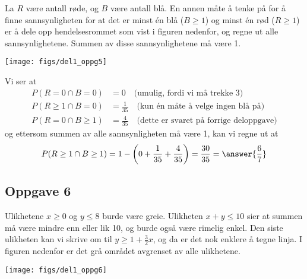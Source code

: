 \begin{easylist}[enumerate]
	La $R$ være antall røde, og $B$ være antall blå.
	En annen måte å tenke på for å finne sannsynligheten for at det er minst én blå ($B \geq 1$) og minst én rød ($R \geq 1$) er å dele opp hendelsesrommet som vist i figuren nedenfor, og regne ut alle sannsynlighetene. Summen av disse sannsynlighetene må være 1.
	\begin{center}
		\texttt{[image: figs/del1\_oppg5]}
	\end{center}
	Vi ser at
	\begin{align*}
		P(R = 0 \cap B = 0) &= 0  \quad \text{(umulig, fordi vi må trekke 3)}\\
		P(R \geq 1 \cap B = 0) &= \frac{1}{35} \quad \text{(kun én måte å velge ingen blå på)}\\
		P(R = 0 \cap B \geq 1) &= \frac{4}{35} \quad \text{(dette er svaret på forrige deloppgave)}
	\end{align*}
	og ettersom summen av alle sannsynligheten må være 1, kan vi regne ut at
	\begin{equation*}
		P(R \geq 1 \cap B \geq 1) = 1 -
		\left( 0 + 
		\frac{1}{35} + 
		\frac{4}{35}\right) = \frac{30}{35} = \answer{\frac{6}{7}}
	\end{equation*}
\end{easylist}

\subsection*{Oppgave 6}
Ulikhetene $x \geq 0$ og $y \leq 8$ burde være greie.
Ulikheten $x + y \leq 10$ sier at summen må være mindre enn eller lik 10, og burde også være rimelig enkel. Den siste ulikheten kan vi skrive om til $y \geq 1 + \frac{3}{2}x$, og da er det nok enklere å tegne linja.
I figuren nedenfor er det grå området avgrenset av alle ulikhetene.

\begin{center}
	\texttt{[image: figs/del1\_oppg6]}
\end{center}


